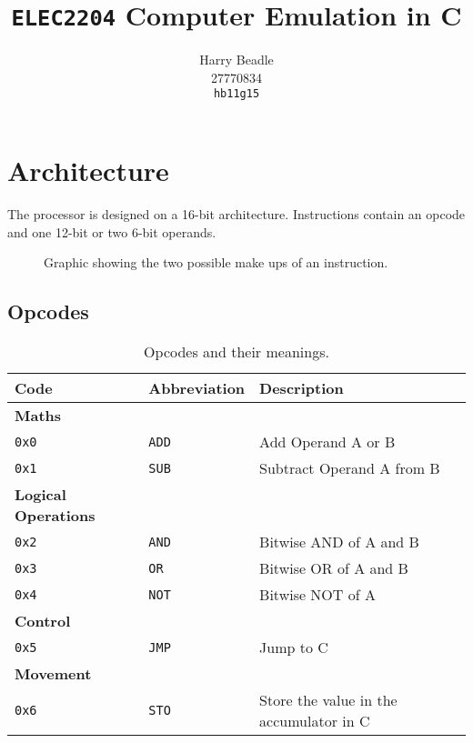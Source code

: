 \documentclass[a4paper]{article}
\title{\texttt{ELEC2204} Computer Emulation in C}
\author{Harry Beadle \\27770834\\\texttt{hb11g15}}
\begin{document}
\maketitle


\section{Architecture}

The processor is designed on a 16-bit architecture. Instructions contain an opcode and one 12-bit or two 6-bit operands.

\begin{figure}[H]
\centering
{}
\caption{Graphic showing the two possible make ups of an instruction.}
\end{figure}

\subsection{Opcodes}

\begin{table}[H]
\centering
\caption{Opcodes and their meanings.}
\begin{tabular}{lll}
Code & Abbreviation & Description \\
\hline
\textbf{Maths} \\
\texttt{0x0} & \texttt{ADD} & Add Operand A or B \\
\texttt{0x1} & \texttt{SUB} & Subtract Operand A from B \\
\textbf{Logical Operations} \\
\texttt{0x2} & \texttt{AND} & Bitwise AND of A and B \\
\texttt{0x3} & \texttt{OR}  & Bitwise OR of A and B \\
\texttt{0x4} & \texttt{NOT} & Bitwise NOT of A \\
\textbf{Control} \\
\texttt{0x5} & \texttt{JMP} & Jump to C \\
\textbf{Movement} \\
\texttt{0x6} & \texttt{STO} & Store the value in the accumulator in C \\
\end{tabular}
\end{table}
\end{document}
